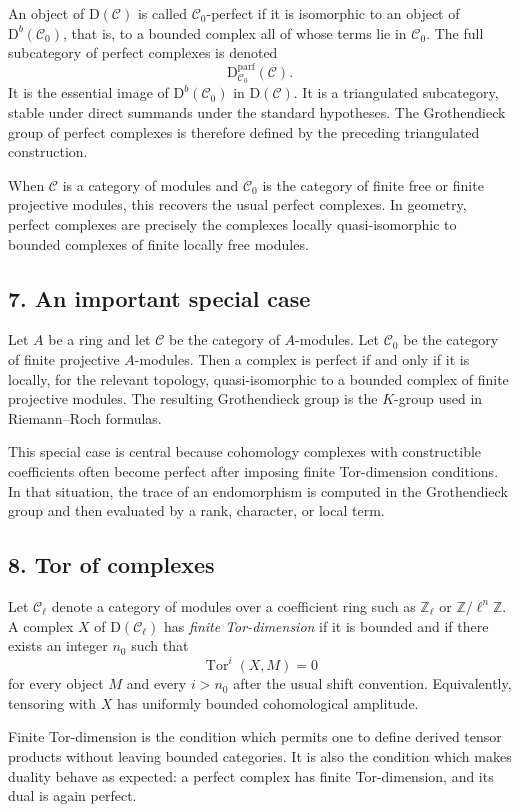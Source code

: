 \documentclass[14pt]{extarticle}
\newcommand{\ZZ}{\mathbb Z}
\newcommand{\D}{\mathrm D}
\newcommand{\cC}{\mathcal C}
\begin{document}
An object of $\D(\cC)$ is called $\cC_0$-perfect if it is isomorphic to an object of $\D^b(\cC_0)$, that is, to a bounded complex all of whose terms lie in $\cC_0$. The full subcategory of perfect complexes is denoted
\[
   \D^{\mathrm{parf}}_{\cC_0}(\cC).
\]
It is the essential image of $\D^b(\cC_0)$ in $\D(\cC)$. It is a triangulated subcategory, stable under direct summands under the standard hypotheses. The Grothendieck group of perfect complexes is therefore defined by the preceding triangulated construction.

When $\cC$ is a category of modules and $\cC_0$ is the category of finite free or finite projective modules, this recovers the usual perfect complexes. In geometry, perfect complexes are precisely the complexes locally quasi-isomorphic to bounded complexes of finite locally free modules.

\subsection*{7. An important special case}

Let $A$ be a ring and let $\cC$ be the category of $A$-modules. Let $\cC_0$ be the category of finite projective $A$-modules. Then a complex is perfect if and only if it is locally, for the relevant topology, quasi-isomorphic to a bounded complex of finite projective modules. The resulting Grothendieck group is the $K$-group used in Riemann--Roch formulas.

This special case is central because cohomology complexes with constructible coefficients often become perfect after imposing finite Tor-dimension conditions. In that situation, the trace of an endomorphism is computed in the Grothendieck group and then evaluated by a rank, character, or local term.

\subsection*{8. Tor of complexes}

Let $\cC_\ell$ denote a category of modules over a coefficient ring such as $\ZZ_\ell$ or $\ZZ/\ell^n\ZZ$. A complex $X$ of $\D(\cC_\ell)$ has \emph{finite Tor-dimension} if it is bounded and if there exists an integer $n_0$ such that
\[
   \operatorname{Tor}^i(X,M)=0
\]
for every object $M$ and every $i>n_0$ after the usual shift convention. Equivalently, tensoring with $X$ has uniformly bounded cohomological amplitude.

Finite Tor-dimension is the condition which permits one to define derived tensor products without leaving bounded categories. It is also the condition which makes duality behave as expected: a perfect complex has finite Tor-dimension, and its dual is again perfect.
\end{document}
